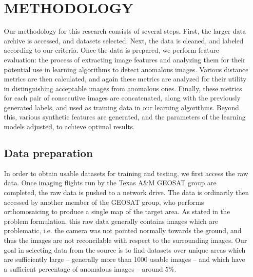 %
%
%



\chapter{METHODOLOGY}

Our methodology for this research consists of several steps.
First, the larger data archive is accessed, and datasets selected.
Next, the data is cleaned, and labeled according to our criteria.
Once the data is prepared, we perform feature evaluation: the process of extracting image features and analyzing them for their potential use in learning algorithms to detect anomalous images.
Various distance metrics are then calculated, and again these metrics are analyzed for their utility in distinguishing acceptable images from anomalous ones.
Finally, these metrics for each pair of consecutive images are concatenated, along with the previously generated labels, and used as training data in our learning algorithms.
Beyond this, various synthetic features are generated, and the parameters of the learning models adjusted, to achieve optimal results.


\section{Data preparation}
In order to obtain usable datasets for training and testing, we first access the raw data.
Once imaging flights run by the Texas A\&M GEOSAT group are completed, the raw data is pushed to a network drive.
The data is ordinarily then accessed by another member of the GEOSAT group, who performs orthomosaicing to produce a single map of the target area.
As stated in the problem formulation, this raw data generally contains images which are problematic, i.e. the camera was not pointed normally towards the ground, and thus the images are not reconcilable with respect to the surrounding images.
Our goal in selecting data from the source is to find datasets over unique areas which are sufficiently large -- generally more than 1000 usable images -- and which have a sufficient percentage of anomalous images -- around 5\%.

